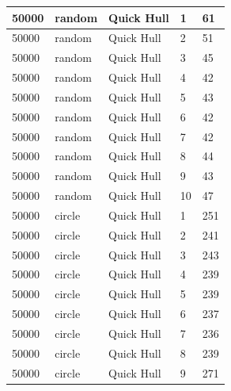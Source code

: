 \documentclass[12pt]{article}
\begin{document}
\begin{longtable}{|l|l|l|l|l|}
50000        & random            & Quick Hull & 1          & 61                            \\ \hline
50000        & random            & Quick Hull & 2          & 51                            \\ \hline
50000        & random            & Quick Hull & 3          & 45                            \\ \hline
50000        & random            & Quick Hull & 4          & 42                            \\ \hline
50000        & random            & Quick Hull & 5          & 43                            \\ \hline
50000        & random            & Quick Hull & 6          & 42                            \\ \hline
50000        & random            & Quick Hull & 7          & 42                            \\ \hline
50000        & random            & Quick Hull & 8          & 44                            \\ \hline
50000        & random            & Quick Hull & 9          & 43                            \\ \hline
50000        & random            & Quick Hull & 10         & 47                            \\ \hline
50000        & circle            & Quick Hull & 1          & 251                           \\ \hline
50000        & circle            & Quick Hull & 2          & 241                           \\ \hline
50000        & circle            & Quick Hull & 3          & 243                           \\ \hline
50000        & circle            & Quick Hull & 4          & 239                           \\ \hline
50000        & circle            & Quick Hull & 5          & 239                           \\ \hline
50000        & circle            & Quick Hull & 6          & 237                           \\ \hline
50000        & circle            & Quick Hull & 7          & 236                           \\ \hline
50000        & circle            & Quick Hull & 8          & 239                           \\ \hline
50000        & circle            & Quick Hull & 9          & 271                           \\ \hline

\end{longtable}
\end{document}
